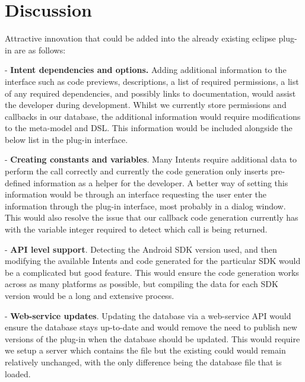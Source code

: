 \section{Discussion}
\label{Discussion}

Attractive innovation that could be added into the already existing eclipse plug-in are as follows:

- \textbf{Intent dependencies and options.} Adding additional information to the interface such as code previews, descriptions, a list of required permissions, a list of any required dependencies, and possibly links to documentation, would assist the developer during development. Whilst we currently store permissions and callbacks in our database, the additional information would require modifications to the meta-model and DSL. This information would be included alongside the below list in the plug-in interface.

- \textbf{Creating constants and variables}. Many Intents require additional data to perform the call correctly and currently the code generation only inserts pre-defined information as a helper for the developer. A better way of setting this information would be through an interface requesting the user enter the information through the plug-in interface, most probably in a dialog window. This would also resolve the issue that our callback code generation currently has with the variable integer required to detect which call is being returned.

- \textbf{API level support}. Detecting the Android SDK version used, and then modifying the available Intents and code generated for the particular SDK would be a complicated but good feature. This would ensure the code generation works across as many platforms as possible, but compiling the data for each SDK version would be a long and extensive process.

- \textbf{Web-service updates}. Updating the database via a web-service API would ensure the database stays up-to-date and would remove the need to publish new versions of the plug-in when the database should be updated. This would require we setup a server which contains the file but the existing could would remain relatively unchanged, with the only difference being the database file that is loaded.
	